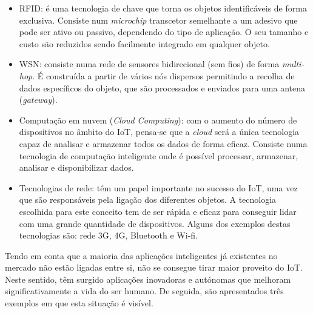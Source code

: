 \begin{itemize}
	\item \ac{RFID}: é uma tecnologia de chave que torna os objetos identificáveis de forma exclusiva. Consiste num \textit{microchip} transcetor semelhante a um adesivo que pode ser ativo ou passivo, dependendo do tipo de aplicação. O seu tamanho e custo são reduzidos sendo facilmente integrado em qualquer objeto. 
	  
	\item \ac{WSN}: consiste numa rede de sensores bidirecional (sem fios) de forma\textit{ multi-hop}. É construída a partir de vários nós dispersos permitindo a recolha de dados específicos do objeto, que são processados e enviados para uma antena (\textit{gateway}). 
	
	\item Computação em nuvem (\textit{Cloud Computing}): com o aumento do número de dispositivos no âmbito do IoT, pensa-se que a \textit{cloud} será a única tecnologia capaz de analisar e armazenar todos os dados de forma eficaz. Consiste numa tecnologia de computação inteligente onde é possível processar, armazenar, analisar e disponibilizar dados.   
	
	\item Tecnologias de rede: têm um papel importante no sucesso do IoT, uma vez que são responsáveis pela ligação dos diferentes objetos. A tecnologia escolhida para este conceito tem de ser rápida e eficaz para conseguir lidar com uma grande quantidade de dispositivos. Alguns dos exemplos destas tecnologias são: rede 3G, 4G, Bluetooth e Wi-fi. 
	
\end{itemize}



Tendo em conta que a maioria das aplicações inteligentes já existentes no mercado não estão ligadas entre si, não se consegue tirar maior proveito do IoT. Neste sentido, têm surgido aplicações inovadoras e autónomas que melhoram significativamente a vida do ser humano\cite{Farooq2015}. De seguida, são apresentados três exemplos em que esta situação é visível. 


